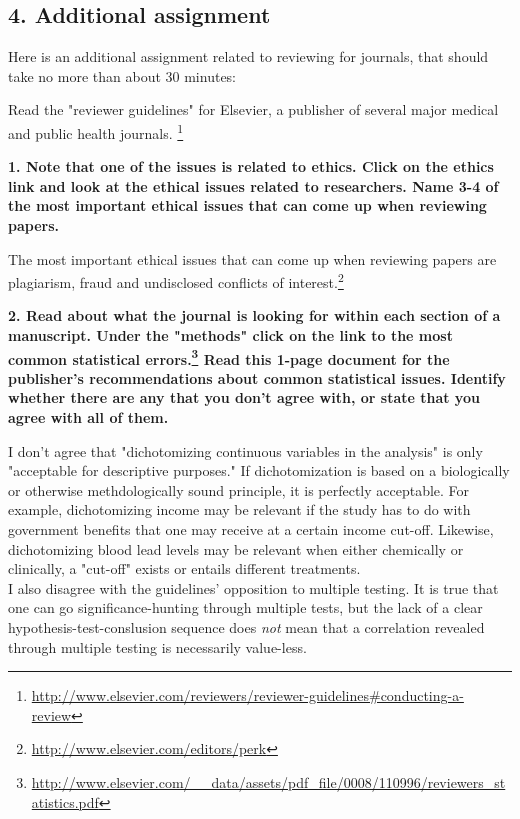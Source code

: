 \documentclass[11pt]{article}
\begin{document}
\begin{multicols}{2}
\subsection*{4. Additional assignment}

Here is an additional assignment related to reviewing for journals, that should take no more than about 30 minutes:

Read the "reviewer guidelines" for Elsevier, a publisher of several major medical and public health journals.  \footnote{\href{http://www.elsevier.com/reviewers/reviewer-guidelines\#conducting-a-review}{http://www.elsevier.com/reviewers/reviewer-guidelines\#conducting-a-review}   } 



\textbf{1.  Note that one of the issues is related to ethics.  Click on the ethics link and look at the ethical issues related to researchers.  Name 3-4 of the most important ethical issues that can come up when reviewing papers.} 

The most important ethical issues that can come up when reviewing papers are plagiarism, fraud and undisclosed conflicts of interest.\footnote{\href{http://www.elsevier.com/editors/perk}{http://www.elsevier.com/editors/perk}}

\textbf{2.   Read about what the journal is looking for within each section of a manuscript.  Under the "methods" click on the link to the most common statistical errors.\footnote{\href{http://www.elsevier.com/\_\_data/assets/pdf\_file/0008/110996/reviewers\_statistics.pdf}{http://www.elsevier.com/\_\_data/assets/pdf\_file/0008/110996/reviewers\_statistics.pdf}  } Read this 1-page document for the publisher's recommendations about common statistical issues.  Identify whether there are any that you don't agree with, or state that you agree with all of them.    
}

I don't agree that "dichotomizing continuous variables in the analysis" is only "acceptable for descriptive purposes."  If dichotomization is based on a biologically or otherwise methdologically sound principle, it is perfectly acceptable.  For example, dichotomizing income may be relevant if the study has to do with government benefits that one may receive at a certain income cut-off.  Likewise, dichotomizing blood lead levels may be relevant when either chemically or clinically, a "cut-off" exists or entails different treatments. \\

I also disagree with the guidelines' opposition to multiple testing.  It is true that one can go significance-hunting through multiple tests, but the lack of a clear hypothesis-test-conslusion sequence does \emph{not} mean that a correlation revealed through multiple testing is necessarily value-less.


\end{multicols}
\end{document}
